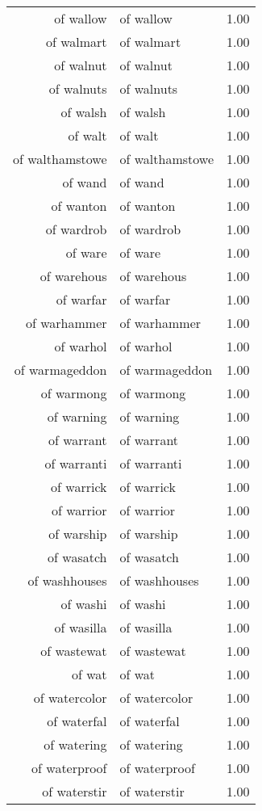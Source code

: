 \begin{table}[ht]
\begin{tabular}{rlr}
  of wallow & of wallow & 1.00 \\ 
  of walmart & of walmart & 1.00 \\ 
  of walnut & of walnut & 1.00 \\ 
  of walnuts & of walnuts & 1.00 \\ 
  of walsh & of walsh & 1.00 \\ 
  of walt & of walt & 1.00 \\ 
  of walthamstowe & of walthamstowe & 1.00 \\ 
  of wand & of wand & 1.00 \\ 
  of wanton & of wanton & 1.00 \\ 
  of wardrob & of wardrob & 1.00 \\ 
  of ware & of ware & 1.00 \\ 
  of warehous & of warehous & 1.00 \\ 
  of warfar & of warfar & 1.00 \\ 
  of warhammer & of warhammer & 1.00 \\ 
  of warhol & of warhol & 1.00 \\ 
  of warmageddon & of warmageddon & 1.00 \\ 
  of warmong & of warmong & 1.00 \\ 
  of warning & of warning & 1.00 \\ 
  of warrant & of warrant & 1.00 \\ 
  of warranti & of warranti & 1.00 \\ 
  of warrick & of warrick & 1.00 \\ 
  of warrior & of warrior & 1.00 \\ 
  of warship & of warship & 1.00 \\ 
  of wasatch & of wasatch & 1.00 \\ 
  of washhouses & of washhouses & 1.00 \\ 
  of washi & of washi & 1.00 \\ 
  of wasilla & of wasilla & 1.00 \\ 
  of wastewat & of wastewat & 1.00 \\ 
  of wat & of wat & 1.00 \\ 
  of watercolor & of watercolor & 1.00 \\ 
  of waterfal & of waterfal & 1.00 \\ 
  of watering & of watering & 1.00 \\ 
  of waterproof & of waterproof & 1.00 \\ 
  of waterstir & of waterstir & 1.00 \\ 

\end{tabular}
\end{table}
